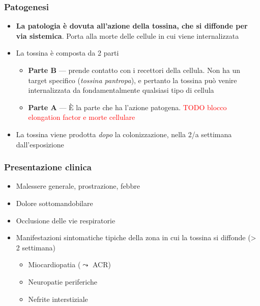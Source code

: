 \documentclass[italian,]{article}
\providecommand{\tightlist}{%
  \setlength{\itemsep}{0pt}\setlength{\parskip}{0pt}}
\newcommand{\TODO}[1]{\textcolor{red}{\textsf{\footnotesize{TODO #1}}}} %
\begin{document}
\hypertarget{patogenesi-5}{%
\subsubsection{Patogenesi}\label{patogenesi-5}}

\begin{itemize}
\tightlist
\item
  \textbf{La patologia è dovuta all'azione della tossina, che si
  diffonde per via sistemica}. Porta alla morte delle cellule in cui
  viene internalizzata
\item
  La tossina è composta da 2 parti

  \begin{itemize}
  \tightlist
  \item
    \textbf{Parte B} --- prende contatto con i recettori della cellula.
    Non ha un target specifico (\emph{tossina pantropa}), e pertanto la
    tossina può venire internalizzata da fondamentalmente qualsiasi tipo
    di cellula
  \item
    \textbf{Parte A} --- È la parte che ha l'azione patogena.
    \TODO{blocco elongation factor e morte cellulare}
  \end{itemize}
\item
  La tossina viene prodotta \emph{dopo} la colonizzazione, nella 2/a
  settimana dall'esposizione
\end{itemize}

\hypertarget{presentazione-clinica}{%
\subsubsection{Presentazione clinica}\label{presentazione-clinica}}

\begin{itemize}
\tightlist
\item
  Malessere generale, prostrazione, febbre
\item
  Dolore sottomandobilare
\item
  Occlusione delle vie respiratorie
\item
  Manifestazioni sintomatiche tipiche della zona in cui la tossina si
  diffonde (\textgreater{} 2 settimana)

  \begin{itemize}
  \tightlist
  \item
    Miocardiopatia (\(\leadsto\) ACR)
  \item
    Neuropatie periferiche
  \item
    Nefrite interstiziale
  \end{itemize}
\end{itemize}
\end{document}
